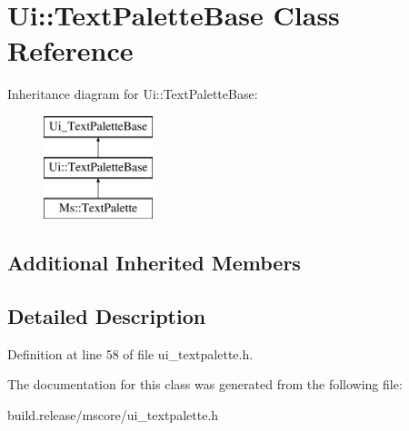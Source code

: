 \hypertarget{class_ui_1_1_text_palette_base}{}\section{Ui\+:\+:Text\+Palette\+Base Class Reference}
\label{class_ui_1_1_text_palette_base}
Inheritance diagram for Ui\+:\+:Text\+Palette\+Base\+:\begin{figure}[H]
\begin{center}
\leavevmode
\includegraphics[height=3.000000cm]{class_ui_1_1_text_palette_base}
\end{center}
\end{figure}
\subsection*{Additional Inherited Members}


\subsection{Detailed Description}


Definition at line 58 of file ui\+\_\+textpalette.\+h.



The documentation for this class was generated from the following file\+:\begin{DoxyCompactItemize}
\item 
build.\+release/mscore/ui\+\_\+textpalette.\+h\end{DoxyCompactItemize}

